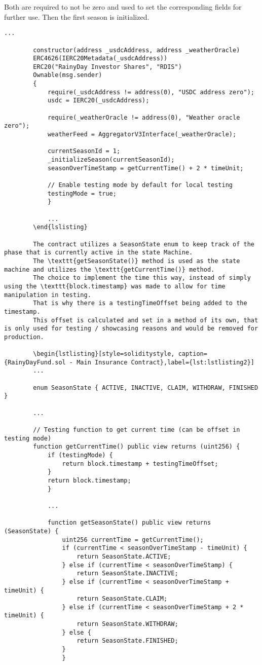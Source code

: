 \documentclass[11pt,a4paper]{article}
\begin{document}
		Both are required to not be zero and used to set the corresponding fields for further use.
		Then the first season is initialized.

		\begin{lstlisting}[style=soliditystyle, caption={RainyDayFund.sol - Main Insurance Contract},label={lst:lstlisting1}]
		...

		constructor(address _usdcAddress, address _weatherOracle)
		ERC4626(IERC20Metadata(_usdcAddress))
		ERC20("RainyDay Investor Shares", "RDIS")
		Ownable(msg.sender)
		{
			require(_usdcAddress != address(0), "USDC address zero");
			usdc = IERC20(_usdcAddress);

			require(_weatherOracle != address(0), "Weather oracle zero");
			weatherFeed = AggregatorV3Interface(_weatherOracle);

			currentSeasonId = 1;
			_initializeSeason(currentSeasonId);
			seasonOverTimeStamp = getCurrentTime() + 2 * timeUnit;

			// Enable testing mode by default for local testing
			testingMode = true;
			}

			...
		\end{lslisting}

		The contract utilizes a SeasonState enum to keep track of the phase that is currently active in the state Machine.
		The \texttt{getSeasonState()} method is used as the state machine and utilizes the \texttt{getCurrentTime()} method.
		The choice to implement the time this way, instead of simply using the \texttt{block.timestamp} was made to allow for time manipulation in testing.
		That is why there is a testingTimeOffset being added to the timestamp.
		This offset is calculated and set in a method of its own, that is only used for testing / showcasing reasons and would be removed for production.

		\begin{lstlisting}[style=soliditystyle, caption={RainyDayFund.sol - Main Insurance Contract},label={lst:lstlisting2}]
		...

		enum SeasonState { ACTIVE, INACTIVE, CLAIM, WITHDRAW, FINISHED }

		...

		// Testing function to get current time (can be offset in testing mode)
		function getCurrentTime() public view returns (uint256) {
			if (testingMode) {
				return block.timestamp + testingTimeOffset;
			}
			return block.timestamp;
			}

			...

			function getSeasonState() public view returns (SeasonState) {
				uint256 currentTime = getCurrentTime();
				if (currentTime < seasonOverTimeStamp - timeUnit) {
					return SeasonState.ACTIVE;
				} else if (currentTime < seasonOverTimeStamp) {
					return SeasonState.INACTIVE;
				} else if (currentTime < seasonOverTimeStamp + timeUnit) {
					return SeasonState.CLAIM;
				} else if (currentTime < seasonOverTimeStamp + 2 * timeUnit) {
					return SeasonState.WITHDRAW;
				} else {
					return SeasonState.FINISHED;
				}
				}


\end{lstlisting}
\end{document}
